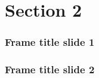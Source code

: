 
\section{Section 2}

\begin{frame}
	\frametitle{Frame title slide 1}

	
\end{frame}


\begin{frame}
	\frametitle{Frame title slide 2}


\end{frame}


